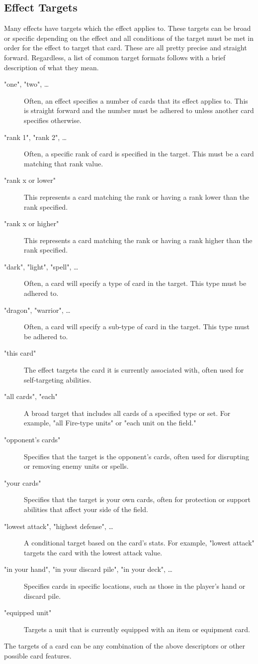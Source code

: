 \subsection{Effect Targets}
Many effects have targets which the effect applies to. These targets can be broad or specific depending on the effect and all conditions of the target must be met in order for the effect to target that card. These are all pretty precise and straight forward. Regardless, a list of common target formats follows with a brief description of what they mean.
\begin{description}
  \item["one", "two", \dots] Often, an effect specifies a number of cards that its effect applies to. This is straight forward and the number must be adhered to unless another card specifies otherwise.
  \item["rank 1", "rank 2", \dots] Often, a specific rank of card is specified in the target. This must be a card matching that rank value.
  \item["rank x or lower"] This represents a card matching the rank or having a rank lower than the rank specified. 
  \item["rank x or higher"]  This represents a card matching the rank or having a rank higher than the rank specified. 
  \item["dark", "light", "spell", \dots] Often, a card will specify a type of card in the target. This type must be adhered to.
  \item["dragon", "warrior", \dots] Often, a card will specify a sub-type of card in the target. This type must be adhered to.
  \item["this card"] The effect targets the card it is currently associated with, often used for self-targeting abilities.
  \item["all cards", "each"] A broad target that includes all cards of a specified type or set. For example, "all Fire-type units" or "each unit on the field."
  \item["opponent's cards"] Specifies that the target is the opponent's cards, often used for disrupting or removing enemy units or spells.
  \item["your cards"] Specifies that the target is your own cards, often for protection or support abilities that affect your side of the field.
  \item["lowest attack", "highest defense", \dots] A conditional target based on the card’s stats. For example, "lowest attack" targets the card with the lowest attack value.
  \item["in your hand", "in your discard pile", "in your deck", \dots] Specifies cards in specific locations, such as those in the player's hand or discard pile.
  \item["equipped unit"] Targets a unit that is currently equipped with an item or equipment card.
\end{description}
The targets of a card can be any combination of the above descriptors or other possible card features.



